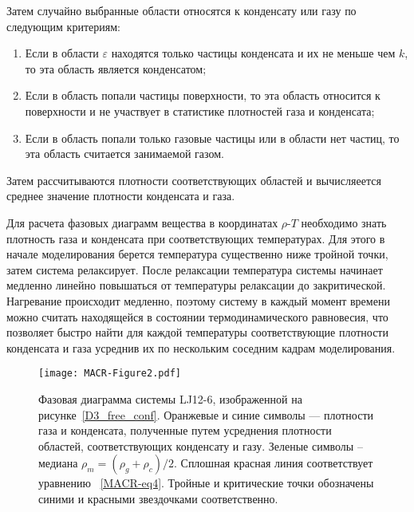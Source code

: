 Затем случайно выбранные области относятся к конденсату или газу по следующим критериям:
\begin{enumerate}
\item Если в области $\varepsilon$ находятся только частицы конденсата и их не меньше чем $k$, то эта область является конденсатом;
\item Если в область попали частицы поверхности, то эта область относится к поверхности и не участвует в статистике плотностей газа и конденсата;
\item Если в область попали только газовые частицы или в области нет частиц, то эта область считается занимаемой газом.
\end{enumerate}
Затем рассчитываются плотности соответствующих областей и вычисляеется среднее значение плотности конденсата и газа.

Для расчета фазовых диаграмм вещества в координатах $\rho$-$T$ необходимо знать плотность газа и конденсата при соответствующих температурах.
Для этого в начале моделирования берется температура существенно ниже тройной точки, затем система релаксирует.
После релаксации температура системы начинает медленно линейно повышаться от температуры релаксации до закритической.
Нагревание происходит медленно, поэтому систему в каждый момент времени можно считать находящейся в состоянии термодинамического равновесия, что позволяет быстро найти для каждой температуры соответствующие плотности конденсата и газа усреднив их по нескольким соседним кадрам моделирования.

\begin{figure}[!t]
  \centering
  \texttt{[image: MACR-Figure2.pdf]}
  \caption{Фазовая диаграмма системы LJ12-6, изображенной на рисунке~\ref{D3_free_conf}.
    Оранжевые и синие символы — плотности газа и конденсата, полученные путем усреднения плотности областей, соответствующих конденсату и газу.
    Зеленые символы -- медиана $\rho_m=(\rho_g+\rho_c)/2$.
    Сплошная красная линия соответствует уравнению ~\eqref{MACR-eq4}.
    Тройные и критические точки обозначены синими и красными звездочками соответственно.}
  \label{phase_diagram}
\end{figure}


